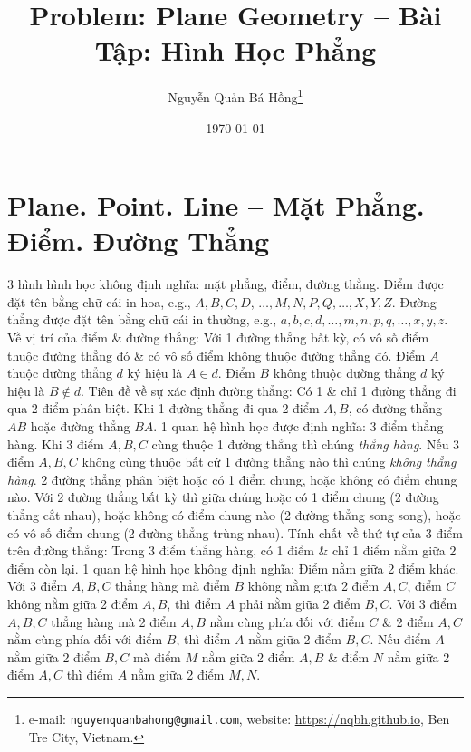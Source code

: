 \documentclass{article}
\title{Problem: Plane Geometry -- Bài Tập: Hình Học Phẳng}
\author{Nguyễn Quản Bá Hồng\footnote{e-mail: \texttt{nguyenquanbahong@gmail.com}, website: \url{https://nqbh.github.io}, Ben Tre City, Vietnam.}}
\date{\today}
\begin{document}
\maketitle
\tableofcontents



\section{Plane. Point. Line -- Mặt Phẳng. Điểm. Đường Thẳng}
 3 hình hình học không định nghĩa: mặt phẳng, điểm, đường thẳng. Điểm được đặt tên bằng chữ cái in hoa, e.g., $A,B,C,D$, $\ldots,M,N,P,Q,\ldots,X,Y,Z$. Đường thẳng được đặt tên bằng chữ cái in thường, e.g., $a,b,c,d,\ldots,m,n,p,q,\ldots,x,y,z$.  {\sf Về vị trí của điểm \& đường thẳng}: Với 1 đường thẳng bất kỳ, có vô số điểm thuộc đường thẳng đó \& có vô số điểm không thuộc đường thẳng đó. Điểm $A$ thuộc đường thẳng $d$ ký hiệu là $A\in d$. Điểm $B$ không thuộc đường thẳng $d$ ký hiệu là $B\notin d$.  {\sf Tiên đề về sự xác định đường thẳng}: Có 1 \& chỉ 1 đường thẳng đi qua 2 điểm phân biệt. Khi 1 đường thẳng đi qua 2 điểm $A,B$, có đường thẳng $AB$ hoặc đường thẳng $BA$. 1 quan hệ hình học được định nghĩa: 3 điểm thẳng hàng. Khi 3 điểm $A,B,C$ cùng thuộc 1 đường thẳng thì chúng \textit{thẳng hàng}. Nếu 3 điểm $A,B,C$ không cùng thuộc bất cứ 1 đường thẳng nào thì chúng \textit{không thẳng hàng}.  2 đường thẳng phân biệt hoặc có 1 điểm chung, hoặc không có điểm chung nào.  Với 2 đường thẳng bất kỳ thì giữa chúng hoặc có 1 điểm chung (2 đường thẳng cắt nhau), hoặc không có điểm chung nào (2 đường thẳng song song), hoặc có vô số điểm chung (2 đường thẳng trùng nhau).  {\sf Tính chất về thứ tự của 3 điểm trên đường thẳng}: Trong 3 điểm thẳng hàng, có 1 điểm \& chỉ 1 điểm nằm giữa 2 điểm còn lại.  1 quan hệ hình học không định nghĩa: Điểm nằm giữa 2 điểm khác.  Với 3 điểm $A,B,C$ thẳng hàng mà điểm $B$ không nằm giữa 2 điểm $A,C$, điểm $C$ không nằm giữa 2 điểm $A,B$, thì điểm $A$ phải nằm giữa 2 điểm $B,C$.  Với 3 điểm $A,B,C$ thẳng hàng mà 2 điểm $A,B$ nằm cùng phía đối với điểm $C$ \& 2 điểm $A,C$ nằm cùng phía đối với điểm $B$, thì điểm $A$ nằm giữa 2 điểm $B,C$.  Nếu điểm $A$ nằm giữa 2 điểm $B,C$ mà điểm $M$ nằm giữa 2 điểm $A,B$ \& điểm $N$ nằm giữa 2 điểm $A,C$ thì điểm $A$ nằm giữa 2 điểm $M,N$.\\
\end{document}
